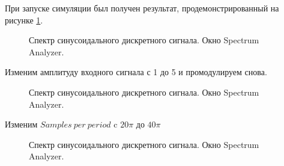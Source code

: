 \documentclass[a4paper,14pt]{extarticle}
\begin{document}
При запуске симуляции был получен результат, продемонстрированный 
на рисунке \ref{005}.

\begin{figure}[H]
\caption{Спектр синусоидального дискретного сигнала. Окно 
Spectrum Analyzer.}
\label{005}
\end{figure}

\newpage

Изменим амплитуду входного сигнала с 1 до 5 и промодулируем 
снова.

\begin{figure}[H]
\caption{Спектр синусоидального дискретного сигнала. Окно 
Spectrum Analyzer.}
\label{006}
\end{figure}

Изменим $Samples \ per \ period$ c $20\pi$ до $40\pi$

\begin{figure}[H]
\caption{Спектр синусоидального дискретного сигнала. Окно 
Spectrum Analyzer.}
\label{007}
\end{figure}
\end{document}
